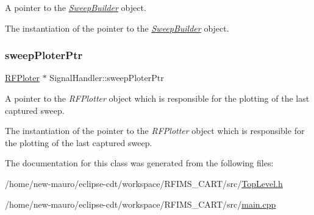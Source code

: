 A pointer to the {\itshape \hyperlink{classSweepBuilder}{Sweep\+Builder}} object. 

The instantiation of the pointer to the {\itshape \hyperlink{classSweepBuilder}{Sweep\+Builder}} object. \mbox{\label{classSignalHandler_a15d34535b8684c5988ff1af1bf6062f6}} 
\subsubsection{\texorpdfstring{sweep\+Ploter\+Ptr}{sweepPloterPtr}}
{\footnotesize\ttfamily \hyperlink{classRFPloter}{R\+F\+Ploter} $\ast$ Signal\+Handler\+::sweep\+Ploter\+Ptr\hspace{0.3cm}{\ttfamily [static]}}



A pointer to the {\itshape R\+F\+Plotter} object which is responsible for the plotting of the last captured sweep. 

The instantiation of the pointer to the {\itshape R\+F\+Plotter} object which is responsible for the plotting of the last captured sweep. 

The documentation for this class was generated from the following files\+:\begin{DoxyCompactItemize}
\item 
/home/new-\/mauro/eclipse-\/cdt/workspace/\+R\+F\+I\+M\+S\+\_\+\+C\+A\+R\+T/src/\hyperlink{TopLevel_8h}{Top\+Level.\+h}\item 
/home/new-\/mauro/eclipse-\/cdt/workspace/\+R\+F\+I\+M\+S\+\_\+\+C\+A\+R\+T/src/\hyperlink{main_8cpp}{main.\+cpp}\end{DoxyCompactItemize}

